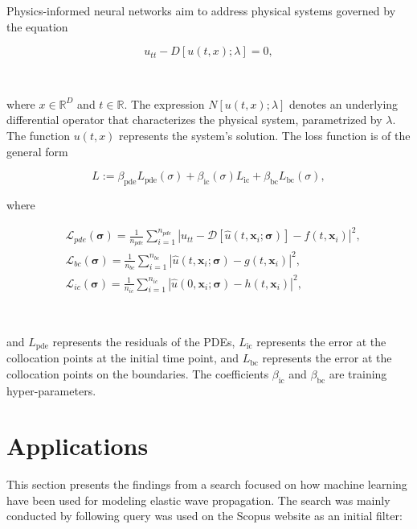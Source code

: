 \documentclass{tufte-handout}
\begin{document}
Physics-informed neural networks aim to address physical systems governed by the equation

$$
u_{tt} - D[u(t, x); \lambda] = 0,
$$

\

where \(x \in \mathbb{R}^D\) and \(t \in \mathbb{R}\). The expression \(N[u(t, x); \lambda]\) denotes an underlying differential operator that characterizes the physical system, parametrized by \(\lambda\). The function \(u(t, x)\) represents the system's solution. The loss function is of the general form 

$$ L := \beta_{\text{pde}}L_{\text{pde}}(\sigma) + \beta_{\text{ic}}(\sigma) L_{\text{ic}} + \beta_{\text{bc}} L_{\text{bc}}(\sigma) ,$$

where

$$
\begin{aligned}
& \mathcal{L}_{pde}(\boldsymbol{\sigma})=\frac{1}{n_{pde}} \sum_{i=1}^{n_{pde}}\left|u_{tt} - \mathcal{D}\left[\hat{u}\left(t, \boldsymbol{x}_i ; \boldsymbol{\sigma}\right)\right]-f\left(t, \boldsymbol{x}_i\right)\right|^2, \\
& \mathcal{L}_{bc}(\boldsymbol{\sigma})=\frac{1}{n_{bc}} \sum_{i=1}^{n_{bc}}\left|\hat{u}\left(t, \boldsymbol{x}_i ; \boldsymbol{\sigma}\right)-g\left(t, \boldsymbol{x}_i\right)\right|^2, \\
& \mathcal{L}_{ic}(\boldsymbol{\sigma})=\frac{1}{n_{ic}} \sum_{i=1}^{n_{ic}}\left|\hat{u}\left(0, \boldsymbol{x}_i ; \boldsymbol{\sigma}\right)-h\left(t,\boldsymbol{x}_i\right)\right|^2,
\end{aligned}
$$

\

and \( L_{\text{pde}} \) represents the residuals of the PDEs, \( L_{\text{ic}} \) represents the error at the collocation points at the initial time point, and \( L_{\text{bc}} \) represents the error at the collocation points on the boundaries. The coefficients \(\beta_{\text{ic}}\) and \(\beta_{\text{bc}}\) are training hyper-parameters.


\section{Applications}

This section presents the findings from a search focused on how machine learning have been used for modeling elastic wave propagation. The search was mainly conducted by following query was used on the Scopus website as an initial filter:
\end{document}
